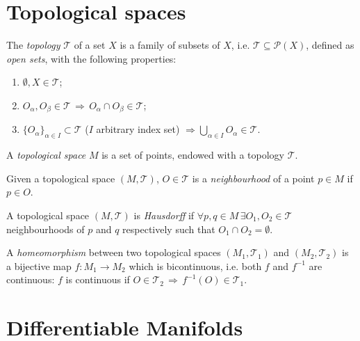 
\section{Topological spaces}

\begin{definition}
  The \textit{topology} $ \mathcal{T} $ of a set $ X $ is a family of subsets of $ X $, i.e. $ \mathcal{T} \subseteq \mathcal{P}(X) $, defined as \textit{open sets}, with the following properties:
  \begin{enumerate}
    \item $ \emptyset,X \in \mathcal{T} $;
    \item $ O_{\alpha},O_{\beta} \in \mathcal{T} \, \Rightarrow\, O_{\alpha}\cap O_{\beta} \in \mathcal{T} $;
    \item $ \{O_{\alpha}\}_{\alpha \in I} \subset \mathcal{T} $ ($ I $ arbitrary index set) $ \Rightarrow \bigcup_{\alpha \in I} O_{\alpha} \in \mathcal{T} $.
  \end{enumerate}
\end{definition}

\begin{definition}
  A \textit{topological space} $ M $ is a set of points, endowed with a topology $ \mathcal{T} $.
\end{definition}

\begin{definition}
  Given a topological space $ (M,\mathcal{T}) $, $ O \in \mathcal{T} $ is a \textit{neighbourhood} of a point $ p \in M $ if $ p \in O $.
\end{definition}

\begin{definition}
  A topological space $ (M,\mathcal{T}) $ is \textit{Hausdorff} if $ \forall p,q \in M \, \exists O_1, O_2 \in \mathcal{T} $ neighbourhoods of $ p $ and $ q $ respectively such that $ O_1 \cap O_2 = \emptyset $.
\end{definition}

\begin{definition}
  A \textit{homeomorphism} between two topological spaces $ (M_1, \mathcal{T}_1) $ and $ (M_2, \mathcal{T}_2) $ is a bijective map $ f : M_1 \rightarrow M_2 $ which is bicontinuous, i.e. both $ f $ and $ f^{-1} $ are continuous: $ f $ is continuous if $ O \in \mathcal{T}_2 \,\Rightarrow\, f^{-1}(O)\in \mathcal{T}_1 $.
\end{definition}

\section{Differentiable Manifolds}


